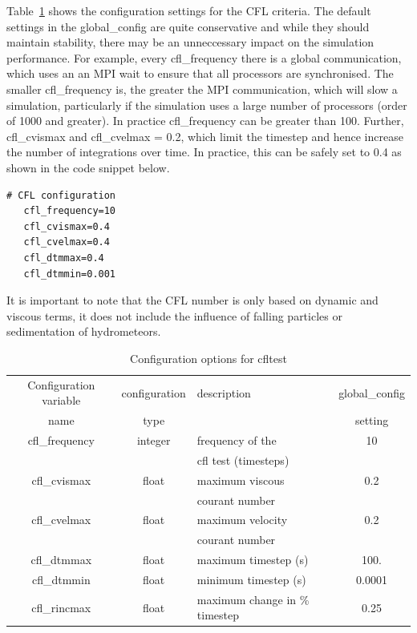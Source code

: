 \documentclass[a4paper,11pt]{article}
\begin{document}
Table~\ref{tab:cfltest} shows the configuration settings for the CFL criteria.
The default settings in the global\_config are quite conservative and while
they should maintain stability, there may be an unneccessary impact on the simulation
performance. For example, every cfl\_frequency there is a global communication,
which uses an an MPI wait to ensure that all processors are synchronised.
The smaller cfl\_frequency is, the greater the MPI communication, which will
slow a simulation, particularly if the simulation uses a large number of
processors (order of 1000 and greater). In practice cfl\_frequency can be greater
than 100. Further, cfl\_cvismax and cfl\_cvelmax = 0.2, which limit the timestep
and hence increase the number of integrations over time. In practice, this can be
safely set to 0.4 as shown in the code snippet below.

\clearpage

\begin{lstlisting}[caption={Example configuration snippet for CFL settings.
   Taken from testcases/stratus/fire\_sc.mcf}]
   # CFL configuration
   cfl_frequency=10
   cfl_cvismax=0.4
   cfl_cvelmax=0.4
   cfl_dtmmax=0.4
   cfl_dtmmin=0.001
\end{lstlisting}

It is important to note that the CFL number is only based on dynamic and viscous
terms, it does not include the influence of falling particles or sedimentation
of hydrometeors.

\begin{table}[H]
  \protect\caption{Configuration options for cfltest}
\label{tab:cfltest}
\begin{tabular}{|c|c|l|c|}
\hline
Configuration variable & configuration & description & global\_config \tabularnewline
name & type & & setting \tabularnewline
\hline
\hline
 cfl\_frequency & integer & frequency of the  & 10  \tabularnewline
   &   & cfl test (timesteps) & \tabularnewline
 \hline
 cfl\_cvismax & float & maximum viscous  &  0.2 \tabularnewline
    &   & courant number & \tabularnewline
  \hline
cfl\_cvelmax & float & maximum velocity & 0.2 \tabularnewline
   &   & courant number & \tabularnewline
 \hline
 cfl\_dtmmax & float & maximum timestep (s) & 100. \tabularnewline
 \hline
  cfl\_dtmmin & float & minimum timestep (s) & 0.0001 \tabularnewline
 \hline
  cfl\_rincmax & float & maximum change in \% timestep & 0.25 \tabularnewline
\hline
\end{tabular}
\end{table}
\end{document}
